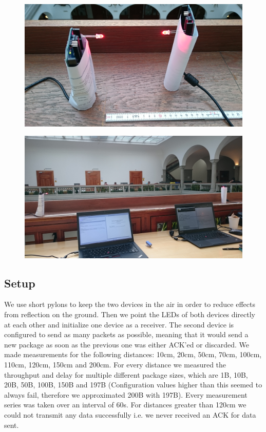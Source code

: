 \begin{figure}[htp]
\centering
\includegraphics[width=\textwidth]{../img/setup_1.JPG}
\caption{}
\label{}
\end{figure}
\begin{figure}[htp]
\centering
\includegraphics[width=\textwidth]{../img/setup_2.JPG}
\caption{}
\label{}
\end{figure}

\subsection{Setup}
We use short pylons to keep the two devices in the air in order to reduce effects from reflection on the ground.
Then we point the LEDs of both devices directly at each other and initialize one device as a receiver. The second device is configured to send as many packets as possible, meaning that it would send a new package as soon as the previous one was either ACK'ed or discarded. We made measurements for the following distances: 10cm, 20cm, 50cm, 70cm, 100cm, 110cm, 120cm, 150cm and 200cm. For every distance we measured the throughput and delay for multiple different package sizes, which are 1B, 10B, 20B, 50B, 100B, 150B and 197B (Configuration values higher than this seemed to always fail, therefore we approximated 200B with 197B).
Every measurement series was taken over an interval of 60s. For distances greater than 120cm we could not transmit any data successfully i.e. we never received an ACK for data sent.



